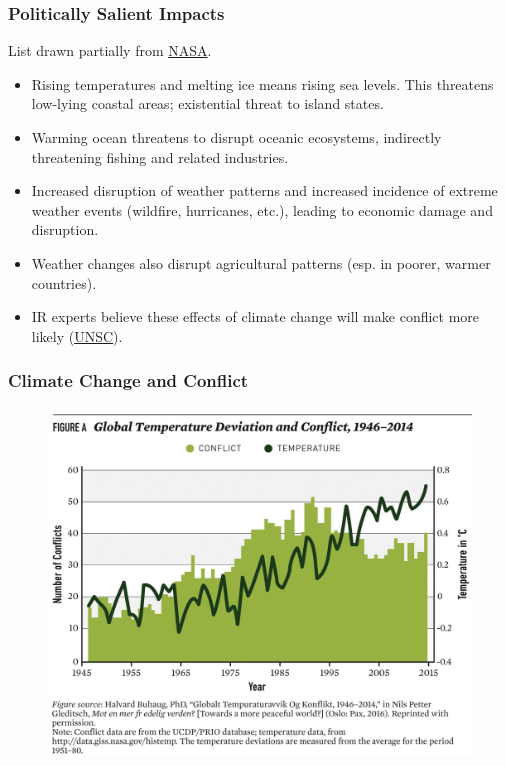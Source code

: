 \documentclass[handout]{beamer}
\begin{document}
\begin{frame} 
	\frametitle{\LARGE{Politically Salient Impacts}}
	List drawn partially from \href{https://climate.nasa.gov/evidence/}{NASA}.
	\begin{itemize}
		\item Rising temperatures and melting ice means rising sea levels. This threatens low-lying coastal areas; existential threat to island states. \pause
		\item Warming ocean threatens to disrupt oceanic ecosystems, indirectly threatening fishing and related industries. \pause
		\item Increased disruption of weather patterns and increased incidence of extreme weather events (wildfire, hurricanes, etc.), leading to economic damage and disruption.
		\item Weather changes also disrupt agricultural patterns (esp. in poorer, warmer countries). \pause
		\item IR experts believe these effects of climate change will make conflict more likely (\href{https://www.un.org/peacebuilding/fr/news/climate-change-recognized-\%E2\%80\%98threat-multiplier\%E2\%80\%99-un-security-council-debates-its-impact-peace}{UNSC}). 
	\end{itemize}
\end{frame}

\begin{frame} 
	\frametitle{\LARGE{Climate Change and Conflict}}
	\begin{figure}[ht!]
		\centering
		\includegraphics[width=\textwidth,height=0.9\textheight, keepaspectratio]{conflict.jpg}
	\end{figure}
\end{frame}
\end{document}
